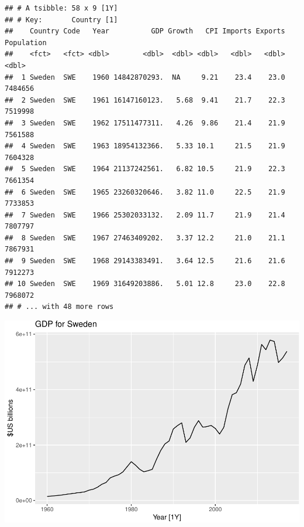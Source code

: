\documentclass[
]{book}
\newenvironment{Shaded}{\begin{snugshade}}{\end{snugshade}}
\newcommand{\FunctionTok}[1]{\textcolor[rgb]{0.00,0.00,0.00}{#1}}
\newcommand{\NormalTok}[1]{#1}
\newcommand{\SpecialCharTok}[1]{\textcolor[rgb]{0.00,0.00,0.00}{#1}}
\newcommand{\StringTok}[1]{\textcolor[rgb]{0.31,0.60,0.02}{#1}}
\begin{document}
\begin{verbatim}
## # A tsibble: 58 x 9 [1Y]
## # Key:       Country [1]
##    Country Code   Year          GDP Growth   CPI Imports Exports Population
##    <fct>   <fct> <dbl>        <dbl>  <dbl> <dbl>   <dbl>   <dbl>      <dbl>
##  1 Sweden  SWE    1960 14842870293.  NA     9.21    23.4    23.0    7484656
##  2 Sweden  SWE    1961 16147160123.   5.68  9.41    21.7    22.3    7519998
##  3 Sweden  SWE    1962 17511477311.   4.26  9.86    21.4    21.9    7561588
##  4 Sweden  SWE    1963 18954132366.   5.33 10.1     21.5    21.9    7604328
##  5 Sweden  SWE    1964 21137242561.   6.82 10.5     21.9    22.3    7661354
##  6 Sweden  SWE    1965 23260320646.   3.82 11.0     22.5    21.9    7733853
##  7 Sweden  SWE    1966 25302033132.   2.09 11.7     21.9    21.4    7807797
##  8 Sweden  SWE    1967 27463409202.   3.37 12.2     21.0    21.1    7867931
##  9 Sweden  SWE    1968 29143383491.   3.64 12.5     21.6    21.6    7912273
## 10 Sweden  SWE    1969 31649203886.   5.01 12.8     23.0    22.8    7968072
## # ... with 48 more rows
\end{verbatim}

\begin{Shaded}
\end{Shaded}

\includegraphics{graphics/unnamed-chunk-24-1.pdf}
\end{document}
